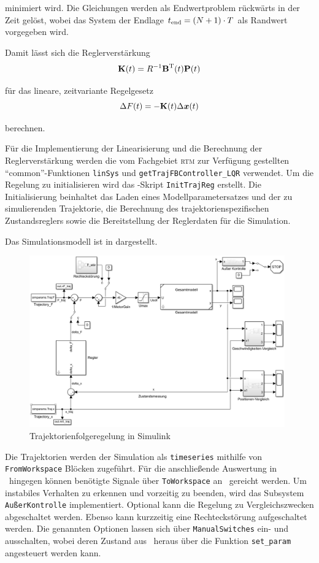 minimiert wird. Die Gleichungen werden als Endwertproblem rückwärts in der Zeit gelöst, wobei das System der Endlage $t_{\mathrm{end}} = (N+1) \cdot T$ als Randwert vorgegeben wird. 

Damit lässt sich die Reglerverstärkung 
	\[
	{\boldsymbol{\mathrm{K}}}(t) = R^{-1} {\boldsymbol{\mathrm{B}}}^{\mathrm{T}}(t) {\boldsymbol{\mathrm{P}}}(t)
\]

für das lineare, zeitvariante Regelgesetz
	\[
	\Delta F(t) = -{\boldsymbol{\mathrm{K}}}(t) \Delta \boldsymbol{x}(t)
\]

berechnen.

Für die Implementierung der Linearisierung und die Berechnung der Reglerverstärkung werden die vom Fachgebiet \textsc{rtm} zur Verfügung gestellten "`common"'-Funktionen \texttt{linSys} und \texttt{getTrajFBController\_LQR} verwendet. Um die Regelung zu initialisieren wird das \Matlab-Skript \texttt{InitTrajReg} erstellt. Die Initialisierung beinhaltet das Laden eines Modellparametersatzes und der zu simulierenden Trajektorie, die Berechnung des trajektorienspezifischen Zustandsreglers sowie die Bereitstellung der Reglerdaten für die Simulation. 

Das Simulationsmodell ist in  dargestellt.

\begin{figure}[h]
	\centering
		\includegraphics[width=0.98\textwidth]{Bilder/Simulink/TFR.PNG}
	\caption{Trajektorienfolgeregelung in Simulink}
	\label{fig:TFR_Simulink}
\end{figure}

Die Trajektorien werden der Simulation als \texttt{timeseries} mithilfe von \texttt{FromWorkspace} Blöcken zugeführt. Für die anschließende Auswertung in \Matlab\ hingegen können benötigte Signale über \texttt{ToWorkspace} an \Matlab\ gereicht werden. Um instabiles Verhalten zu erkennen und vorzeitig zu beenden, wird das Subsystem \texttt{AußerKontrolle} implementiert. Optional kann die Regelung zu Vergleichszwecken abgeschaltet werden. Ebenso kann kurzzeitig eine Rechteckstörung aufgeschaltet werden. Die genannten Optionen lassen sich über \texttt{ManualSwitches} ein- und ausschalten, wobei deren Zustand aus \Matlab\ heraus über die Funktion \texttt{set\_param} angesteuert werden kann.



